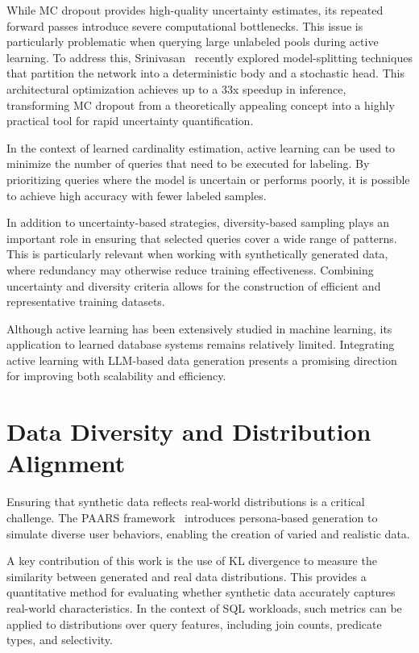 While MC dropout provides high-quality uncertainty estimates, its repeated forward passes introduce severe computational bottlenecks. This issue is particularly problematic when querying large unlabeled pools during active learning. To address this, Srinivasan~\cite{Srinivasan2024Efficient} recently explored model-splitting techniques that partition the network into a deterministic body and a stochastic head. This architectural optimization achieves up to a 33x speedup in inference, transforming MC dropout from a theoretically appealing concept into a highly practical tool for rapid uncertainty quantification.

In the context of learned cardinality estimation, active learning can be used to minimize the number of queries that need to be executed for labeling. By prioritizing queries where the model is uncertain or performs poorly, it is possible to achieve high accuracy with fewer labeled samples.

In addition to uncertainty-based strategies, diversity-based sampling plays an important role in ensuring that selected queries cover a wide range of patterns. This is particularly relevant when working with synthetically generated data, where redundancy may otherwise reduce training effectiveness. Combining uncertainty and diversity criteria allows for the construction of efficient and representative training datasets.

Although active learning has been extensively studied in machine learning, its application to learned database systems remains relatively limited. Integrating active learning with LLM-based data generation presents a promising direction for improving both scalability and efficiency.

\section{Data Diversity and Distribution Alignment}

Ensuring that synthetic data reflects real-world distributions is a critical challenge. The PAARS framework~\cite{DBLP:journals/corr/abs-2503-24228} introduces persona-based generation to simulate diverse user behaviors, enabling the creation of varied and realistic data.

A key contribution of this work is the use of KL divergence to measure the similarity between generated and real data distributions. This provides a quantitative method for evaluating whether synthetic data accurately captures real-world characteristics. In the context of SQL workloads, such metrics can be applied to distributions over query features, including join counts, predicate types, and selectivity.

